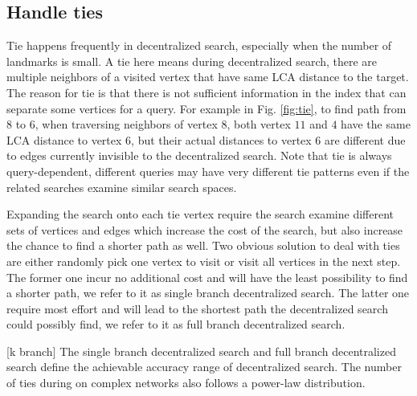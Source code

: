 \subsection{Handle ties}

Tie happens frequently in decentralized search, especially when the number of landmarks is small. A tie here means during decentralized search, there are multiple neighbors of a visited vertex that have same LCA distance to the target. The reason for tie is that there is not sufficient information in the index that can separate some vertices for a query. For example in Fig. \ref{fig:tie}, to find path from $8$ to $6$, when traversing neighbors of vertex $8$, both vertex $11$ and $4$ have the same LCA distance to vertex $6$, but their actual distances to vertex $6$ are different due to edges currently invisible to the decentralized search. Note that tie is always query-dependent, different queries may have very different tie patterns even if the related searches examine similar search spaces. 

Expanding the search onto each tie vertex require the search examine different sets of vertices and edges which increase the cost of the search, but also increase the chance to find a shorter path as well. Two obvious solution to deal with ties are either randomly pick one vertex to visit or visit all vertices in the next step. The former one incur no additional cost and will have the least possibility to find a shorter path, we refer to it as single branch decentralized search. The latter one require most effort and will lead to the shortest path the decentralized search could possibly find, we refer to it as full branch decentralized search.

[k branch] The single branch decentralized search and full branch decentralized search define the achievable accuracy range of decentralized search. The number of ties during on complex networks also follows a power-law distribution.
